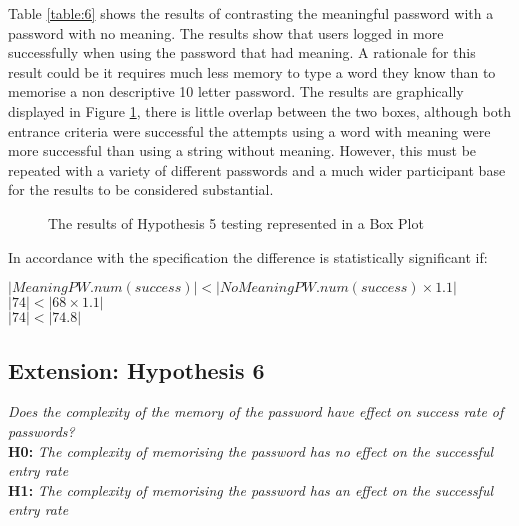 \documentclass{article}
\begin{document}
Table \ref{table:6} shows the results of contrasting the meaningful password with a password with no meaning. The results show that users logged in more successfully when using the password that had meaning. A rationale for this result could be it requires much less memory to type a word they know than to memorise a non descriptive 10 letter password. The results are graphically displayed in Figure \ref{fig:boxPlotHyp5}, there is little overlap between the two boxes, although both entrance criteria were successful the attempts using a word with meaning were more successful than using a string without meaning. However, this must be repeated with a variety of different passwords and a much wider participant base for the results to be considered substantial. 

\begin{figure} [H]
    \centering
    \caption{The results of Hypothesis 5 testing represented in a Box Plot}
    \label{fig:boxPlotHyp5}
\end{figure}

In accordance with the specification the difference is statistically significant if: 
\begin{center}
    $ |MeaningPW.num(success)| < |NoMeaningPW.num(success) \times 1.1|$ \\
    $ |74| < |68 \times 1.1| $ \\
    $ |74| < |74.8| $
\end{center} 


\subsection{Extension: Hypothesis 6}
\begin{center}
\textit{Does the complexity of the memory of the password have effect on success rate of passwords?} \newline \\
\textbf{H0:} \textit{The complexity of memorising the password has no effect on the successful entry rate} \newline \\
\textbf{H1:} \textit{The complexity of memorising the password has an effect on the successful entry rate}
\end{center}
\end{document}
